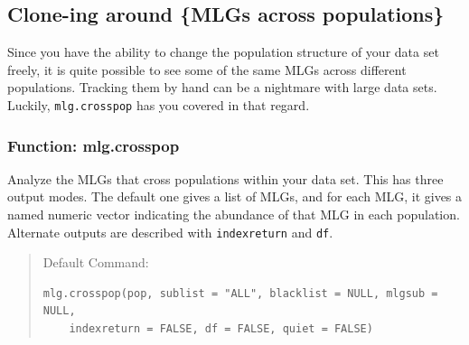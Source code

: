 \documentclass[letterpaper]{article}\usepackage[]{graphicx}\usepackage[]{color}
\makeatletter
\newenvironment{kframe}{%
 \def\at@end@of@kframe{}%
 \ifinner\ifhmode%
  \def\at@end@of@kframe{\end{minipage}}%
  \begin{minipage}{\columnwidth}%
 \fi\fi%
 \def\FrameCommand##1{\hskip\@totalleftmargin \hskip-\fboxsep
 \colorbox{shadecolor}{##1}\hskip-\fboxsep
     \hskip-\linewidth \hskip-\@totalleftmargin \hskip\columnwidth}%
 \MakeFramed {\advance\hsize-\width
   \@totalleftmargin\z@ \linewidth\hsize
   \@setminipage}}%
 {\par\unskip\endMakeFramed%
 \at@end@of@kframe}
\newenvironment{knitrout}{}{} %
\newcommand{\tab}{\hspace*{1em}}
\makeatother
\begin{document}
\subsection{Clone-ing around \{MLGs across populations\}}\label{mlg:cross}

\tab\tab Since you have the ability to change the population structure of your data set freely, it is quite possible to see some of the same MLGs across different populations. Tracking them by hand can be a nightmare with large data sets. Luckily, \texttt{mlg.crosspop} has you covered in that regard.
\subsubsection{Function: mlg.crosspop}\label{mlg:cross:mlg.crosspop}

\tab\tab Analyze the MLGs that cross populations within your data set. This has three output modes. The default one gives a list of MLGs, and for each MLG, it gives a named numeric vector indicating the abundance of that MLG in each population. Alternate outputs are described with \texttt{indexreturn} and \texttt{df}.
\begin{quote}
Default Command:
\begin{knitrout}
\color{fgcolor}\begin{kframe}
\begin{verbatim}
mlg.crosspop(pop, sublist = "ALL", blacklist = NULL, mlgsub = NULL, 
    indexreturn = FALSE, df = FALSE, quiet = FALSE)
\end{verbatim}
\end{kframe}
\end{knitrout}

\end{quote}
\end{document}

